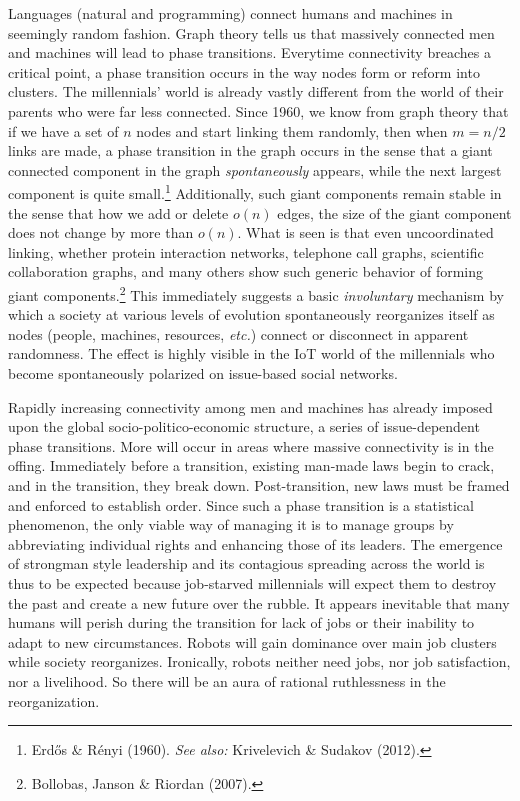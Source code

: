 \begin{multicols}{2}
Languages (natural and programming) connect humans and machines in seemingly random fashion. Graph theory tells us that massively connected men and machines will lead to phase transitions. Everytime connectivity breaches a critical point, a phase transition occurs in the way nodes form or reform into clusters. The millennials' world is already vastly different from the world of their parents who were far less connected. Since 1960, we know from graph theory that if we have a set of $n$ nodes and start linking them randomly, then when $m = n/2$ links are made, a phase transition in the graph occurs in the sense that a giant connected component in the graph \textit{spontaneously} appears, while the next largest component is quite small.\footnote{Erdős \& Rényi (1960). \textit{See also:} Krivelevich \& Sudakov (2012).} Additionally, such giant components remain stable in the sense that how we add or delete $o(n)$ edges, the size of the giant component does not change by more than $o(n)$. What is seen is that even uncoordinated linking, whether protein interaction networks, telephone call graphs, scientific collaboration graphs, and many others show such generic behavior of forming giant components.\footnote{Bollobas, Janson \& Riordan (2007).} This immediately suggests a basic \textit{involuntary} mechanism by which a society at various levels of evolution spontaneously reorganizes itself as nodes (people, machines, resources, \textit{etc.}) connect or disconnect in apparent randomness. The effect is highly visible in the IoT world of the millennials who become spontaneously polarized on issue-based social networks.

Rapidly increasing connectivity among men and machines has already imposed upon the global socio-politico-economic structure, a series of issue-dependent phase transitions. More will occur in areas where massive connectivity is in the offing. Immediately before a transition, existing man-made laws begin to crack, and in the transition, they break down. Post-transition, new laws must be framed and enforced to establish order. Since such a phase transition is a statistical phenomenon, the only viable way of managing it is to manage groups by abbreviating individual rights and enhancing those of its leaders. The emergence of strongman style leadership and its contagious spreading across the world is thus to be expected because job-starved millennials will expect them to destroy the past and create a new future over the rubble. It appears inevitable that many humans will perish during the transition for lack of jobs or their inability to adapt to new circumstances. Robots will gain dominance over main job clusters while society reorganizes. Ironically, robots neither need jobs, nor job satisfaction, nor a livelihood. So there will be an aura of rational ruthlessness in the reorganization.


\end{multicols}
